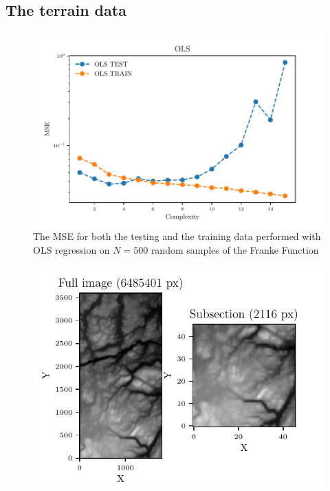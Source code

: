 \documentclass[reprint, english, nofootinbib]{revtex4-2}
\begin{document}
\subsection{The terrain data}



    \begin{figure}[h!tb]
        \center
        \includegraphics[width=\columnwidth]{../figs/OLS_MSE_Bootstrap_Hastie_211_N_500.pdf}
        \caption{\label{fig:Hastie2.11 MSE Bootstrap}The MSE for both the testing and the training data performed with OLS regression on $N=500$ random samples of the Franke Function}
    \end{figure}


    \begin{figure}[h!tb]
        \center
        \includegraphics[width=\columnwidth]{TerrainData.pdf}
        \caption{\label{fig:terrain image}}
    \end{figure}
\end{document}
